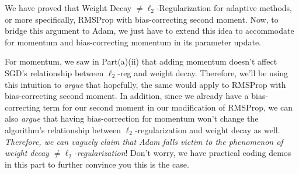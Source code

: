 
We have proved that Weight Decay $\neq \ell_2$-Regularization for adaptive methods, or more specifically, RMSProp with bias-correcting second moment. Now, to bridge this argument to Adam, we just have to extend this idea to accommodate for momentum and bias-correcting momentum in its parameter update.
    
For momentum, we saw in Part(a)(ii) that adding momentum doesn't affect SGD's relationship between $\ell_2$-reg and weight decay. Therefore, we'll be using this intuition to \textit{argue} that hopefully, the same would apply to RMSProp with bias-correcting second moment. In addition, since we already have a bias-correcting term for our second moment in our modification of RMSProp, we can also \textit{argue} that having bias-correction for momentum won't change the algorithm's relationship between $\ell_2$-regularization and weight decay as well. \textit{Therefore, we can vaguely claim that Adam falls victim to the phenomenon of weight decay $\neq \ell_2$-regularization}! Don't worry, we have practical coding demos in this part to further convince you this is the case.

